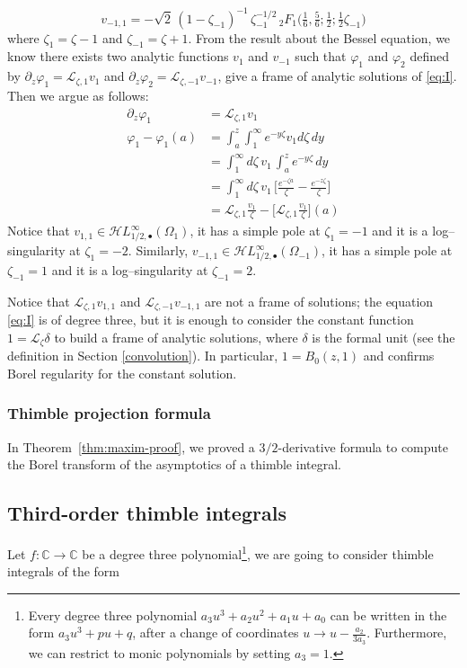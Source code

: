 \documentclass{article}
\newcommand{\singexp}[2]{\mathcal{H}L^\infty_{#1, #2}}
\newcommand{\singexpalg}[1]{\singexp{#1}{\bullet}}
\newcommand{\C}{\mathbb{C}}
\newcommand{\laplace}{\mathcal{L}}
\theoremstyle{definition}
\theoremstyle{plain}
\newenvironment{verify}{\color{ForestGreen}}{\color{black}}
\begin{document}
\[ v_{-1,1}=-\sqrt{2}\, (1-\zeta_{-1})^{-1}\, \zeta_{-1}^{-1/2}\, {}_2F_1\Big(\tfrac{1}{6},\tfrac{5}{6};\tfrac{1}{2};\tfrac{1}{2}\zeta_{-1}\Big)\]
where $\zeta_1=\zeta-1$ and $\zeta_{-1}=\zeta+1$. 
\begin{verify}
From the result about the Bessel equation, we know there exists two analytic functions $v_1$ and $v_{-1}$ such that $\varphi_1$ and $\varphi_2$ defined by $\partial_z\varphi_1=\laplace_{\zeta,1}v_1$ and $\partial_z\varphi_2=\laplace_{\zeta,-1}v_{-1}$, give a frame of analytic solutions of \eqref{eq:I}. Then we argue as follows:
\begin{align*}
    \partial_z\varphi_1&=\laplace_{\zeta,1}v_1\\
    \varphi_1-\varphi_1(a)&=\int_a^z\int_1^{\infty}e^{-y\zeta} v_1 d\zeta \, dy\\
    &=\int_1^{\infty}d\zeta\,  v_1 \, \int_a^ze^{-y\zeta}  \, dy\\
    &=\int_1^{\infty}d\zeta\,  v_1 \, \Big[\frac{e^{-\zeta a}}{\zeta}-\frac{e^{-z\zeta}}{\zeta}\Big]\\
    &=\laplace_{\zeta,1} \tfrac{v_1}{\zeta}-\Big[\laplace_{\zeta,1}\tfrac{v_1}{\zeta}\Big](a)
\end{align*}
\end{verify}
Notice that $v_{1,1}\in\singexpalg{1/2}(\Omega_1)$, it has a simple pole at $\zeta_1=-1$ and it is a log--singularity at $\zeta_1=-2$. Similarly, $v_{-1,1}\in\singexpalg{1/2}(\Omega_{-1})$, it has a simple pole at $\zeta_{-1}=1$ and it is a log--singularity at $\zeta_{-1}=2$.

Notice that $\laplace_{\zeta,1}v_{1,1}$ and $\laplace_{\zeta,-1}v_{-1,1}$ are not a frame of solutions; the equation \eqref{eq:I} is of degree three, but it is enough to consider the constant function $1=\laplace_\zeta \delta$ to build a frame of analytic solutions, where $\delta$ is the formal unit (see the definition in Section \ref{convolution}). In particular, $1=B_0(z,1)$ and confirms Borel regularity for the constant solution. 
%
\color{RoyalBlue}
\subsubsection{Thimble projection formula}
In Theorem~\ref{thm:maxim-proof}, we proved a $3/2$-derivative formula to compute the Borel transform of the asymptotics of a thimble integral.
\color{black}
\subsection{Third-order thimble integrals}
Let $f\colon\C\to \C$ be a degree three polynomial\footnote{Every degree three polynomial $a_3 u^3+a_2 u^2+a_1 u+a_0$ can be written in the form $a_3u^3+pu+q$, after a change of coordinates $u\to u-\frac{a_2}{3 a_3}$. Furthermore, we can restrict to monic polynomials by setting $a_3=1$.}, we are going to consider thimble integrals of the form 
\end{document}
